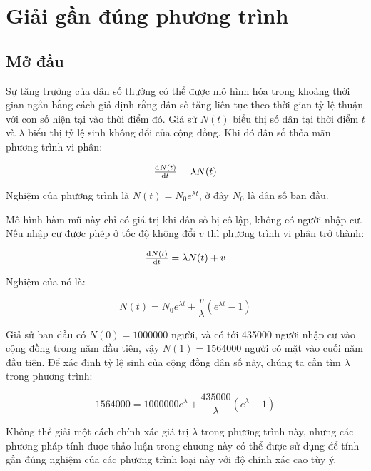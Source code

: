 \documentclass[../../Lectures.tex]{subfiles}
\begin{document}
\chapter{Giải gần đúng phương trình}


\section{Mở đầu}

Sự tăng trưởng của dân số thường có thể được mô hình hóa trong khoảng thời gian
ngắn bằng cách giả định rằng dân số tăng liên tục theo thời gian tỷ lệ thuận với
con số hiện tại vào thời điểm đó. Giả sử \(N(t)\) biểu thị số dân tại thời điểm
\(t\) và \(\lambda\) biểu thị tỷ lệ sinh không đổi của cộng đồng. Khi đó dân số
thỏa mãn phương trình vi phân:

\[\od{N(t)}{t} = \lambda N(t)\]

Nghiệm của phương trình là \(N(t) = N_0 e^{\lambda t}\), ở đây \(N_0\) là dân số
ban đầu.


Mô hình hàm mũ này chỉ có giá trị khi dân số bị cô lập, không có người nhập cư.
Nếu nhập cư được phép ở tốc độ không đổi \(v\) thì phương trình vi phân trở
thành:

\[\od{N(t)}{t} = \lambda N(t) + v\]

Nghiệm của nó là:

\[N(t) = N_0 e^{\lambda t} + \frac{v}{\lambda} (e^{\lambda t} - 1)\]

Giả sử ban đầu có \(N(0) = \num{1000000}\) người, và có tới \num{435000} người
nhập cư vào cộng đồng trong năm đầu tiên, vậy \(N(1) = \num{1564000}\) người có
mặt vào cuối năm đầu tiên. Để xác định tỷ lệ sinh của cộng đồng dân số này,
chúng ta cần tìm \(\lambda\) trong phương trình:

\[\num{1564000} = \num{1000000} e^\lambda + \frac{\num{435000}}{\lambda} (e^\lambda - 1)\]

Không thể giải một cách chính xác giá trị \(\lambda\) trong phương trình này,
nhưng các phương pháp tính được thảo luận trong chương này có thể được sử dụng
để tính gần đúng nghiệm của các phương trình loại này với độ chính xác cao tùy
ý.


\end{document}
